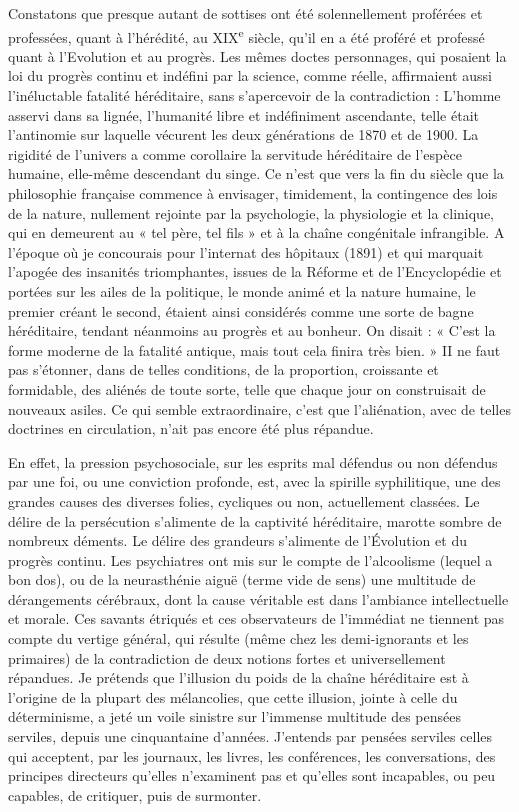 \documentclass[french,twoside]{book} %
\begin{document}
Constatons que presque autant de sottises ont été solennellement proférées et professées, quant à l’hérédité, au XIX\textsuperscript{e} siècle, qu’il en a été proféré et professé quant à l’Evolution et au progrès. Les mêmes doctes personnages, qui posaient la loi du progrès continu et indéfini par la science, comme réelle, affirmaient aussi l’inéluctable fatalité héréditaire, sans s’apercevoir de la contradiction : L’homme asservi dans sa lignée, l’humanité libre et indéfiniment ascendante, telle était l’antinomie sur laquelle vécurent les deux générations de 1870 et de 1900. La rigidité de l’univers a comme corollaire la servitude héréditaire de l’espèce humaine, elle-même descendant du singe. Ce n’est que vers la fin du siècle que la philosophie française commence à envisager, timidement, la contingence des lois de la nature, nullement rejointe par la psychologie, la physiologie et la clinique, qui en demeurent au « tel père, tel fils » et à la chaîne congénitale infrangible. A l’époque où je concourais pour l’internat des hôpitaux (1891) et qui marquait l’apogée des insanités triomphantes, issues de la Réforme et de l’Encyclopédie et portées sur les ailes de la politique, le monde animé et la nature humaine, le premier créant le second, étaient ainsi considérés comme une sorte de bagne héréditaire, tendant néanmoins au progrès et au bonheur. On disait : « C’est la forme moderne de la fatalité antique, mais tout cela finira très bien. » II ne faut pas s’étonner, dans de telles conditions, de la proportion, croissante et formidable, des aliénés de toute sorte, telle que chaque jour on construisait de nouveaux asiles. Ce qui semble extraordinaire, c’est que l’aliénation, avec de telles doctrines en circulation, n’ait pas encore été plus répandue.\par
En effet, la pression psychosociale, sur les esprits mal défendus ou non défendus par une foi, ou une conviction profonde, est, avec la spirille syphilitique, une des grandes causes des diverses folies, cycliques ou non, actuellement classées. Le délire de la persécution s’alimente de la captivité héréditaire, marotte sombre de nombreux déments. Le délire des grandeurs s’alimente de l’Évolution et du progrès continu. Les psychiatres ont mis sur le compte de l’alcoolisme (lequel a bon dos), ou de la neurasthénie aiguë (terme vide de sens) une multitude de dérangements cérébraux, dont la cause véritable est dans l’ambiance intellectuelle et morale. Ces savants étriqués et ces observateurs de l’immédiat ne tiennent pas compte du vertige général, qui résulte (même chez les demi-ignorants et les primaires) de la contradiction de deux notions fortes et universellement répandues. Je prétends que l’illusion du poids de la chaîne héréditaire est à l’origine de la plupart des mélancolies, que cette illusion, jointe à celle du déterminisme, a jeté un voile sinistre sur l’immense multitude des pensées serviles, depuis une cinquantaine d’années. J’entends par pensées serviles celles qui acceptent, par les journaux, les livres, les conférences, les conversations, des principes directeurs qu’elles n’examinent pas et qu’elles sont incapables, ou peu capables, de critiquer, puis de surmonter.\par
\end{document}

